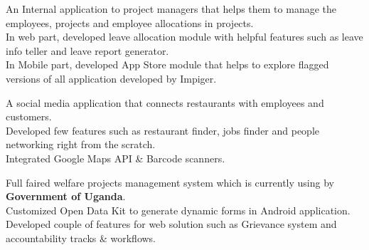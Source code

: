 \documentclass[a4paper]{arun-resume} %
\begin{document}
\begin{minipage}[t]{0.65\textwidth}
\sectionspace %




An Internal application to project managers that helps them to manage the employees, projects and
employee allocations in projects. \\
In web part, developed leave allocation module with helpful features such as leave info teller and leave
report generator. \\
In Mobile part, developed App Store module that helps to explore flagged versions of all application
developed by Impiger. \\

\sectionspace %




A social media application that connects restaurants with employees and customers.\\
Developed few features such as restaurant finder, jobs finder and people networking right from the scratch.\\
Integrated Google Maps API \& Barcode scanners.

\sectionspace %




Full faired welfare projects management system which is currently using by \textbf{Government of Uganda}.\\
Customized Open Data Kit to generate dynamic forms in Android application.\\
Developed couple of features for web solution such as Grievance system and accountability tracks \&
workflows.

\sectionspace %





\end{minipage}
\end{document}
